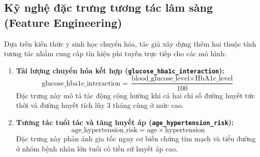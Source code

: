 \documentclass[12pt,a4paper]{report}
\begin{document}
\subsection{Kỹ nghệ đặc trưng tương tác lâm sàng (Feature Engineering)}
Dựa trên kiến thức y sinh học chuyển hóa, tác giả xây dựng thêm hai thuộc tính tương tác nhằm cung cấp tín hiệu phi tuyến trực tiếp cho các mô hình:
\begin{enumerate}
    \item \textbf{Tải lượng chuyển hóa kết hợp (\texttt{glucose\_hba1c\_interaction}):}
    \begin{equation}
        \text{glucose\_hba1c\_interaction} = \frac{\text{blood\_glucose\_level} \times \text{HbA1c\_level}}{100}
    \end{equation}
    Đặc trưng này mô tả tác động cộng hưởng khi cả hai chỉ số đường huyết tức thời và đường huyết tích lũy 3 tháng cùng ở mức cao.
    \item \textbf{Tương tác tuổi tác và tăng huyết áp (\texttt{age\_hypertension\_risk}):}
    \begin{equation}
        \text{age\_hypertension\_risk} = \text{age} \times \text{hypertension}
    \end{equation}
    Đặc trưng này phản ánh gia tốc nguy cơ biến chứng tim mạch và tiểu đường ở nhóm bệnh nhân lớn tuổi có tiền sử huyết áp cao.
\end{enumerate}
\end{document}
